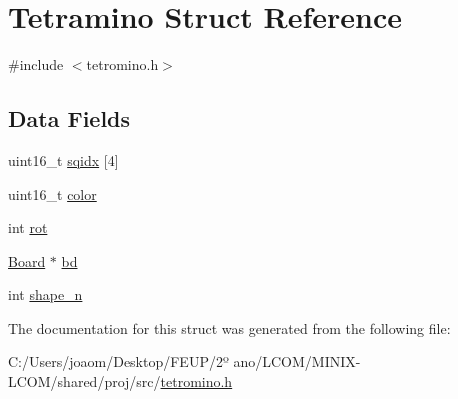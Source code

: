 \hypertarget{struct_tetramino}{}\section{Tetramino Struct Reference}
\label{struct_tetramino}


{\ttfamily \#include $<$tetromino.\+h$>$}

\subsection*{Data Fields}
\begin{DoxyCompactItemize}
\item 
uint16\+\_\+t \mbox{\hyperlink{group__tetramino_ga9d0491d7027bf54689b51ff9e57b3703}{sqidx}} \mbox{[}4\mbox{]}
\item 
uint16\+\_\+t \mbox{\hyperlink{group__tetramino_ga0b10c5b0fa8e65e009263b93ba2671ae}{color}}
\item 
int \mbox{\hyperlink{group__tetramino_gae4edf8f6630ef7f8b4c587348a3001a7}{rot}}
\item 
\mbox{\hyperlink{struct_board}{Board}} $\ast$ \mbox{\hyperlink{group__tetramino_ga30c121d94ba906148e5a4b0546e723a3}{bd}}
\item 
int \mbox{\hyperlink{group__tetramino_ga7aa41fc2efed4bde82530b155c4000f1}{shape\+\_\+n}}
\end{DoxyCompactItemize}


The documentation for this struct was generated from the following file\+:\begin{DoxyCompactItemize}
\item 
C\+:/\+Users/joaom/\+Desktop/\+F\+E\+U\+P/2º ano/\+L\+C\+O\+M/\+M\+I\+N\+I\+X-\/\+L\+C\+O\+M/shared/proj/src/\mbox{\hyperlink{tetromino_8h}{tetromino.\+h}}\end{DoxyCompactItemize}
